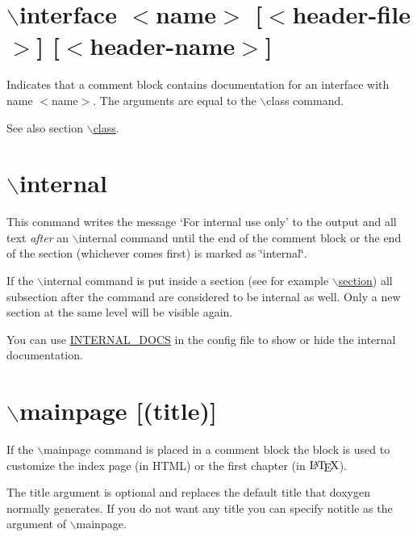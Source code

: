  \hypertarget{commands_cmdinterface}{}\section{$\backslash$interface $<$name$>$ \mbox{[}$<$header-\/file$>$\mbox{]} \mbox{[}$<$header-\/name$>$\mbox{]}}\label{commands_cmdinterface}
 Indicates that a comment block contains documentation for an interface with name $<$name$>$. The arguments are equal to the $\backslash$class command.

\begin{DoxySeeAlso}{See also}
section \hyperlink{commands_cmdclass}{$\backslash$class}.
\end{DoxySeeAlso}


 \hypertarget{commands_cmdinternal}{}\section{$\backslash$internal}\label{commands_cmdinternal}
 This command writes the message `For internal use only' to the output and all text {\itshape after\/} an {\ttfamily $\backslash$internal} command until the end of the comment block or the end of the section (whichever comes first) is marked as \char`\"{}internal\char`\"{}.

If the $\backslash$internal command is put inside a section (see for example \hyperlink{commands_cmdsection}{$\backslash$section}) all subsection after the command are considered to be internal as well. Only a new section at the same level will be visible again.

You can use \hyperlink{config_cfg_internal_docs}{INTERNAL\_\-DOCS} in the config file to show or hide the internal documentation.



 \hypertarget{commands_cmdmainpage}{}\section{$\backslash$mainpage \mbox{[}(title)\mbox{]}}\label{commands_cmdmainpage}

If the $\backslash$mainpage command is placed in a comment block the block is used to customize the index page (in HTML) or the first chapter (in $\mbox{\LaTeX}$).

The title argument is optional and replaces the default title that doxygen normally generates. If you do not want any title you can specify {\ttfamily notitle} as the argument of $\backslash$mainpage.

